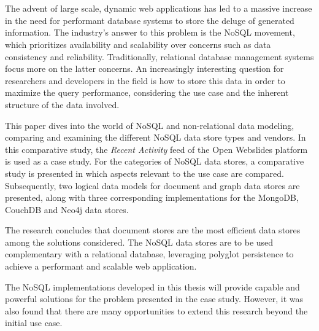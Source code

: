 \chapter*{}

The advent of large scale, dynamic web applications has led to a massive increase in the need for performant database systems to store the deluge of generated information.
The industry's answer to this problem is the NoSQL movement, which prioritizes availability and scalability over concerns such as data consistency and reliability.
Traditionally, relational database management systems focus more on the latter concerns.
An increasingly interesting question for researchers and developers in the field is how to store this data in order to maximize the query performance, considering the use case and the inherent structure of the data involved.

This paper dives into the world of NoSQL and non-relational data modeling, comparing and examining the different NoSQL data store types and vendors.
In this comparative study, the \textit{Recent Activity} feed of the Open Webslides platform is used as a case study.
For the  categories of NoSQL data stores, a comparative study is presented in which aspects relevant to the use case are compared.
Subsequently, two logical data models for document and graph data stores are presented, along with three corresponding implementations for the MongoDB, CouchDB and Neo4j data stores.

The research concludes that document stores are the most efficient data stores among the solutions considered.
The NoSQL data stores are to be used complementary with a relational database, leveraging polyglot persistence to achieve a performant and scalable web application.

The NoSQL implementations developed in this thesis will provide capable and powerful solutions for the problem presented in the case study.
However, it was also found that there are many opportunities to extend this research beyond the initial use case.
